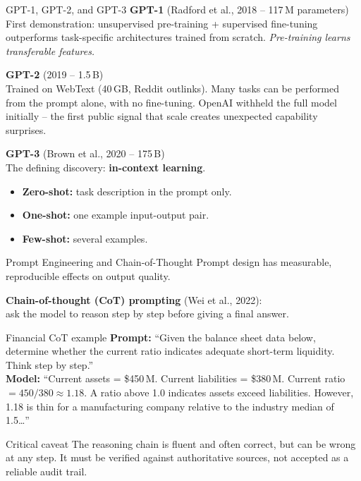 \documentclass[11pt,aspectratio=169,professionalfonts]{beamer}
\begin{document}
\begin{frame}{GPT-1, GPT-2, and GPT-3}
  \textbf{GPT-1} (Radford et al., 2018 -- 117\,M parameters)\\
  First demonstration: unsupervised pre-training + supervised fine-tuning
  outperforms task-specific architectures trained from scratch.
  \emph{Pre-training learns transferable features.}

  \medskip
  \textbf{GPT-2} (2019 -- 1.5\,B)\\
  Trained on WebText (40\,GB, Reddit outlinks).
  Many tasks can be performed from the prompt alone, with no fine-tuning.
  OpenAI withheld the full model initially -- the first public signal that
  scale creates unexpected capability surprises.

  \medskip
  \textbf{GPT-3} (Brown et al., 2020 -- 175\,B)\\
  The defining discovery: \textbf{in-context learning}.
  \begin{itemize}
    \item \textbf{Zero-shot:} task description in the prompt only.
    \item \textbf{One-shot:} one example input-output pair.
    \item \textbf{Few-shot:} several examples.
  \end{itemize}
\end{frame}
%
%
\begin{frame}{Prompt Engineering and Chain-of-Thought}
  Prompt design has measurable, reproducible effects on output quality.

  \medskip
  \textbf{Chain-of-thought (CoT) prompting} (Wei et al., 2022):\\
  ask the model to reason step by step before giving a final answer.

  \begin{exampleblock}{Financial CoT example}
    \textbf{Prompt:} ``Given the balance sheet data below, determine
    whether the current ratio indicates adequate short-term liquidity.
    Think step by step.''\\[0.2em]
    \textbf{Model:} ``Current assets = \$450\,M.
    Current liabilities = \$380\,M.
    Current ratio $= 450/380 \approx 1.18$.
    A ratio above 1.0 indicates assets exceed liabilities.
    However, 1.18 is thin for a manufacturing company relative to the
    industry median of 1.5\ldots''
  \end{exampleblock}

  \begin{alertblock}{Critical caveat}
    The reasoning chain is fluent and often correct, but can be
    wrong at any step.
    It must be verified against authoritative sources,
    not accepted as a reliable audit trail.
  \end{alertblock}
\end{frame}
%
\end{document}
